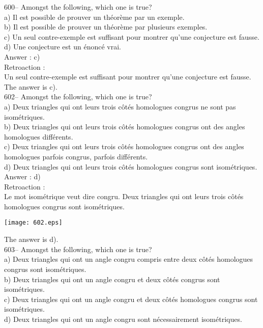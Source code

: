 ﻿\documentclass[letterpaper, 12pt]{article}
\begin{document}
600-- Amongst the following, which one is true?\\
a) Il est possible de prouver un th\'eor\`eme par un exemple.\\
b) Il est possible de prouver un th\'eor\`eme par plusieurs exemples.\\
c) Un seul contre-exemple est suffisant pour montrer qu'une conjecture est
fausse.\\
d) Une conjecture est un \'enonc\'e vrai.\\

Answer : c)\\

Retroaction : \\
Un seul contre-exemple est suffisant pour montrer qu'une conjecture est
fausse.  The answer is c).\\



602-- Amongst the following, which one is true?\\
a) Deux triangles qui ont leurs trois c\^ot\'es homologues congrus ne sont
pas isom\'etriques.\\
b) Deux triangles qui ont leurs trois c\^ot\'es homologues congrus ont des
angles homologues diff\'erents.\\
c) Deux triangles qui ont leurs trois c\^ot\'es homologues congrus ont des
angles homologues parfois congrus, parfois diff\'erents.\\
d) Deux triangles qui ont leurs trois c\^ot\'es homologues congrus sont
isom\'etriques.\\

Answer : d)\\

Retroaction : \\
Le mot isom\'etrique veut dire congru.  Deux triangles qui ont leurs
trois c\^ot\'es homologues congrus sont isom\'etriques.
\begin{center}
    \texttt{[image: 602.eps]}
    \end{center} The answer is d).\\

603-- Amongst the following, which one is true?\\
a) Deux triangles qui ont un angle congru compris entre deux c\^ot\'es
homologues congrus sont isom\'etriques. \\
b) Deux triangles qui ont un angle congru et deux c\^ot\'es congrus sont
isom\'etriques.\\
c) Deux triangles qui ont un angle congru et deux c\^ot\'es homologues
congrus sont isom\'etriques.\\
d) Deux triangles qui ont un angle congru sont n\'ecessairement
isom\'etriques.\\
\end{document}
